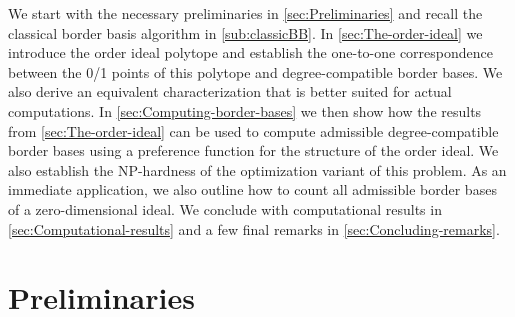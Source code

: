 \documentclass[11pt,oneside,english]{amsart}
\makeatletter
\numberwithin{equation}{section}
\numberwithin{figure}{section}
\theoremstyle{plain}
\theoremstyle{definition}
\theoremstyle{definition}
\theoremstyle{remark}
\theoremstyle{plain}
\theoremstyle{plain}
\theoremstyle{plain}
\theoremstyle{problem@}
\newcounter{problem}
\makeatother
\begin{document}
We start with the necessary preliminaries in \autoref{sec:Preliminaries}
and recall the classical border basis algorithm in \autoref{sub:classicBB}.
In \autoref{sec:The-order-ideal} we introduce the order ideal
polytope and establish the one-to-one correspondence between the 0/1
points of this polytope and degree-compatible border bases. We also
derive an equivalent characterization that is better suited for actual
computations. In \autoref{sec:Computing-border-bases} we then
show how the results from \autoref{sec:The-order-ideal} can be
used to compute admissible degree-compatible border bases using a
preference function for the structure of the order ideal.
We also establish the {\textrm{NP}\xspace}-hardness of the optimization variant of this
problem.
As an immediate
application, we also outline how to count all admissible border bases
of a zero-dimensional ideal.  We conclude
with computational results in \autoref{sec:Computational-results}
and a few final remarks in \autoref{sec:Concluding-remarks}.

\section{\label{sec:Preliminaries}Preliminaries}
\end{document}
